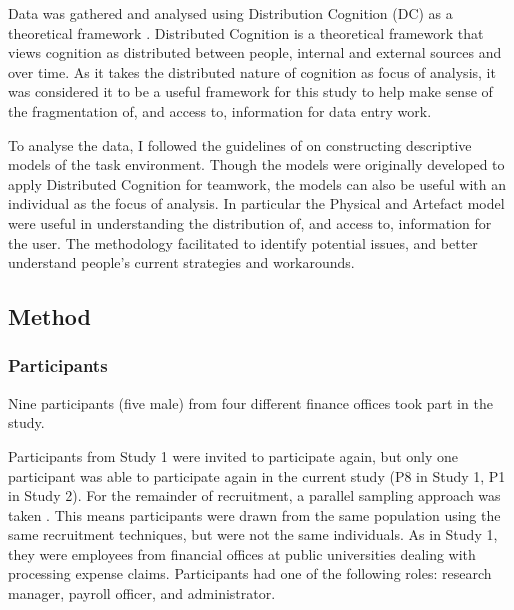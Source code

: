Data was gathered and analysed using Distribution Cognition (DC) as a theoretical framework \citep{Hutchins1995}. Distributed Cognition is a theoretical framework that views cognition as distributed between people, internal and external sources and over time. 
As it takes the distributed nature of cognition as focus of analysis, it was considered it to be a useful framework for this study to help make sense of the fragmentation of, and access to, information for data entry work. 


To analyse the data, I followed the guidelines of \citet{Furniss2006} on constructing descriptive models of the task environment. Though the models were originally developed to apply Distributed Cognition for teamwork, the models can also be useful with an individual as the focus of analysis. In particular the Physical and Artefact model were useful in understanding the distribution of, and access to, information for the user. The methodology facilitated to identify potential issues, and better understand people’s current strategies and workarounds. 

\subsection{Method}
\subsubsection{Participants}
Nine participants (five male) from four different finance offices took part in the study. 

Participants from Study 1 were invited to participate again, but only one participant was able to participate again in the current study (P8 in Study 1, P1 in Study 2). 
For the remainder of recruitment, a parallel sampling approach was taken \citep{Onwuegbuzie2008}. This means participants were drawn from the same population using the same recruitment techniques, but were not the same individuals. As in Study 1, they were employees from financial offices at public universities dealing with processing expense claims. Participants had one of the following roles: research manager, payroll officer, and administrator.

